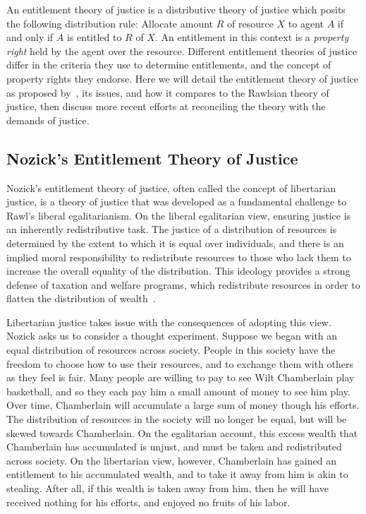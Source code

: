 An entitlement theory of justice is a distributive theory of justice which
posits the following distribution rule: Allocate amount $R$ of resource $X$ to 
agent $A$ if and only if $A$ is entitled to $R$ of $X$. An entitlement in this
context is a \textit{property right} held by the agent over the resource. 
Different entitlement theories of justice differ in the criteria they use to 
determine entitlements, and the concept of property rights they endorse.
Here we will detail the entitlement theory of justice as proposed
by~\cite{Nozick_1974}, its issues, and how it compares to the Rawlsian theory of
justice, then discuss more recent efforts at reconciling the theory with the
demands of justice.

\subsection{Nozick's Entitlement Theory of Justice}

Nozick's entitlement theory of justice, often called the concept of libertarian
justice, is a theory of justice that was developed as a fundamental challenge to
Rawl's liberal egalitarianism. On the liberal egalitarian view, ensuring justice
is an inherently redistributive task. The justice of a distribution of resources
is determined by the extent to which it is equal over individuals, and there is
an implied moral responsibility to redistribute resources to those who lack them
to increase the overall equality of the distribution. This ideology provides a
strong defense of taxation and welfare programs, which redistribute resources
in order to flatten the distribution of wealth~\citep{Rawls_1971}.

Libertarian justice takes issue with the consequences of adopting this view.
Nozick asks us to consider a thought experiment. Suppose we began with an equal
distribution of resources across society. People in this society have the
freedom to choose how to use their resources, and to exchange them with others 
as they feel is fair. Many people are willing to pay to see Wilt Chamberlain 
play basketball, and so they each pay him a small amount of money to see him 
play. Over time, Chamberlain will accumulate a large sum of money though his 
efforts. The distribution of resources in the society will no longer be equal,
but will be skewed towards Chamberlain. On the egalitarian account, this excess 
wealth that Chamberlain has accumulated is unjust, and must be taken and
redistributed across society. On the libertarian view, however, Chamberlain has
gained an entitlement to his accumulated wealth, and to take it away from him
is akin to stealing. After all, if this wealth is taken away from him, then he
will have received nothing for his efforts, and enjoyed no fruits of his labor.

